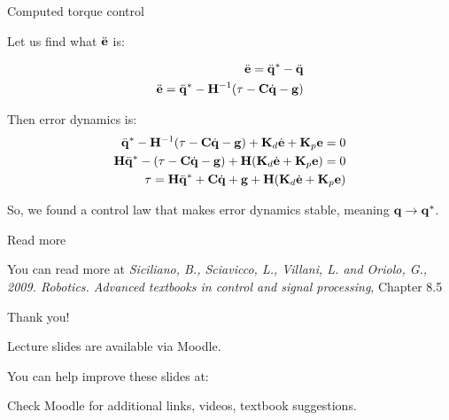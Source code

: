 \documentclass{beamer}
\begin{document}
\begin{frame}{Computed torque control}
	\begin{flushleft}
		
		Let us find what  $\ddot{\mathbf{e}}$ is:
		
		\begin{align}
			\ddot{\mathbf{e}} = \ddot{\mathbf{q}}^* - \ddot{\mathbf{q}} 
			\\
			\ddot{\mathbf{e}} = \ddot{\mathbf{q}}^* -  \mathbf{H}^{-1}(\tau - \mathbf{C} \dot{\mathbf{q}} - \mathbf{g})
		\end{align}
	
		Then error dynamics is:
		\begin{align}
\ddot{\mathbf{q}}^* -  \mathbf{H}^{-1}(\tau - \mathbf{C} \dot{\mathbf{q}} - \mathbf{g})
 + \mathbf{K}_d \dot{\mathbf{e}} + \mathbf{K}_p \mathbf{e} = 0
 \\
\mathbf{H}\ddot{\mathbf{q}}^* - (\tau - \mathbf{C} \dot{\mathbf{q}} - \mathbf{g})
+ \mathbf{H}(\mathbf{K}_d \dot{\mathbf{e}} + \mathbf{K}_p \mathbf{e}) = 0 
\\
\tau = \mathbf{H}\ddot{\mathbf{q}}^* + \mathbf{C} \dot{\mathbf{q}} + \mathbf{g} +
\mathbf{H}(\mathbf{K}_d \dot{\mathbf{e}} + \mathbf{K}_p \mathbf{e})
		\end{align}				
	
	So, we found a control law that makes error dynamics stable, meaning $\mathbf{q} \rightarrow \mathbf{q}^*$.
		
	\end{flushleft}
\end{frame}




\begin{frame}{Read more}
	\begin{flushleft}
		
		You can read more at \emph{ Siciliano, B., Sciavicco, L., Villani, L. and Oriolo, G., 2009. Robotics. Advanced textbooks in control and signal processing}, Chapter 8.5
		

\end{flushleft}
\end{frame}


\begin{frame}{Thank you!}
\centerline{Lecture slides are available via Moodle.}
\bigskip
\centerline{You can help improve these slides at:}
\centerline{\mygit}
\bigskip
\centerline{Check Moodle for additional links, videos, textbook suggestions.}
\bigskip

\centerline{\textcolor{black}{}}

\end{frame}
\end{document}
